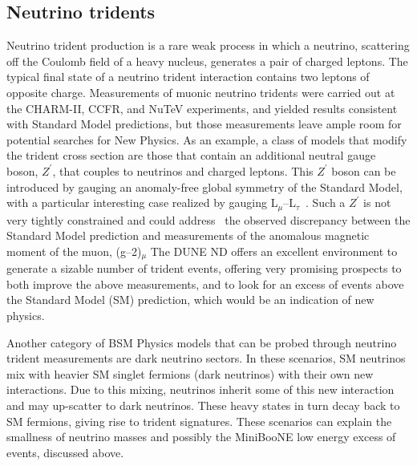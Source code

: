 \subsection{Neutrino tridents}
 Neutrino trident production is a rare weak process in which a neutrino, scattering off the Coulomb
 field of a heavy nucleus, generates a pair of charged leptons. The typical final state of a neutrino
 trident interaction contains two leptons of opposite charge. Measurements of muonic neutrino
 tridents were carried out at the CHARM-II, CCFR, and NuTeV experiments, and yielded results
 consistent with Standard Model predictions, but those measurements leave ample room for 
 potential searches for New Physics. As an example, a class of models that modify the trident cross
 section are those that contain an additional neutral gauge boson, $Z^\prime$, 
 that couples to neutrinos and charged leptons. This $Z^\prime$
 boson can be introduced by gauging an anomaly-free global symmetry
of the Standard Model, with a particular interesting case realized by gauging L$_{\mu}$--L$_{\tau}$~\cite{He:1990pn,He:1991qd}. Such a $Z^\prime$
 is not very tightly constrained and could address~\cite{Baek:2001kca,Harigaya:2013twa} the observed discrepancy between the Standard
Model prediction and measurements of the anomalous magnetic moment of the muon, (g--2)$_{\mu}$
 The DUNE ND offers an excellent environment to generate a sizable number of trident events,
  offering very promising prospects to both improve the above measurements, and to
 look for an excess of events above the Standard Model (SM) prediction, which would be an 
  indication of new physics. 
  
  Another category of BSM Physics
 models that can be probed through neutrino trident measurements are dark neutrino sectors. In
 these scenarios, SM neutrinos mix with heavier SM singlet fermions (dark neutrinos) with their
 own new interactions. Due to this mixing, neutrinos inherit some of this new interaction and may
 up-scatter to dark neutrinos. These heavy states in turn decay back to SM fermions, giving rise
 to trident signatures. These scenarios can explain the smallness of neutrino masses and possibly
 the MiniBooNE low energy excess of events, discussed above.

